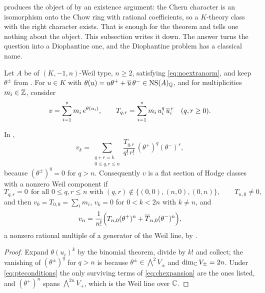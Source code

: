  produces the object of  by an
existence argument: the Chern character is an isomorphism onto the Chow ring
with rational coefficients, so a $K$-theory class with the right character
exists. That is enough for the theorem and tells one nothing about the object.
This subsection writes it down. The answer turns the question into a
Diophantine one, and the Diophantine problem has a classical name.

\begin{setupenv}\label{setup:pte}
Let $A$ be of $(K,-1,n)$-Weil type, $n\ge2$, satisfying
\eqref{eq:noextranorm}, and keep $\theta^{\pm}$ from
. For $u\in K$ with $\theta(u)=u\theta^{+}+\overline{u}\,\theta^{-}\in\mathrm{NS}(A)_{\mathbb{Q}}$, and for multiplicities $m_{i}\in\mathbb{Z}$, consider
\[
  v=\sum_{i=1}^{s}m_{i}\,e^{\theta(u_{i})},
  \qquad
  T_{q,r}=\sum_{i=1}^{s}m_{i}\,u_{i}^{q}\,\overline{u}_{i}^{\,r}
  \quad (q,r\ge0).
\]
\end{setupenv}

\begin{proposition}
\label{prop:chintermsofu}
In ,
\begin{equation}\label{eq:chexpansion}
  v_{k}
  =\sum_{\substack{q+r=k\\ 0\le q,r\le n}}
    \frac{T_{q,r}}{q!\,r!}\,(\theta^{+})^{q}(\theta^{-})^{r},
\end{equation}
because $(\theta^{\pm})^{q}=0$ for $q>n$. Consequently $v$ is a flat section
of Hodge classes with a nonzero Weil component if
\begin{equation}\label{eq:pteconditions}
  T_{q,r}=0\ \ \text{for all } 0\le q,r\le n \text{ with }
  (q,r)\notin\{(0,0),(n,0),(0,n)\},
  \qquad T_{n,0}\ne0,
\end{equation}
and then $v_{0}=T_{0,0}=\sum_{i}m_{i}$, $v_{k}=0$ for $0<k<2n$ with $k\ne n$,
and
\[
  v_{n}=\frac{1}{n!}\Bigl(T_{n,0}(\theta^{+})^{n}
        +\overline{T}_{n,0}(\theta^{-})^{n}\Bigr),
\]
a nonzero rational multiple of a generator of the Weil line, by
.
\end{proposition}

\begin{proof}
Expand $\theta(u_{i})^{k}$ by the binomial theorem, divide by $k!$ and collect;
the vanishing of $(\theta^{\pm})^{q}$ for $q>n$ is because
$\theta^{\pm}\in\bigwedge^{2}V_{\pm}$ and $\dim_{\mathbb{C}}V_{\pm}=2n$. Under
\eqref{eq:pteconditions} the only surviving terms of \eqref{eq:chexpansion}
are the ones listed, and $(\theta^{+})^{n}$ spans $\bigwedge^{2n}V_{+}$, which
is the Weil line over $\mathbb{C}$.
\end{proof}

